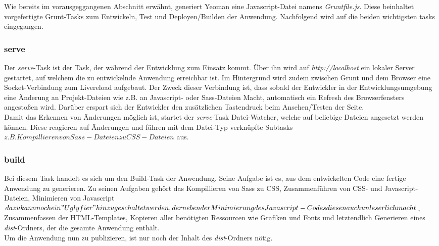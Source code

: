 Wie bereits im vorausgeggangenen Abschnitt erwähnt, generiert Yeoman eine Javascript-Datei namens \textit{Gruntfile.js}. Diese beinhaltet vorgefertigte Grunt-Tasks zum Entwickeln, Test und
Deployen/Builden der Anwendung. Nachfolgend wird auf die beiden wichtigsten tasks eingegangen.

\subsubsection{serve}
Der \textit{serve}-Task ist der Task, der während der Entwicklung zum Einsatz kommt. Über ihn wird auf \textit{http://localhost} ein lokaler Server gestartet, auf welchem
die zu entwickelnde Anwendung erreichbar ist. Im Hintergrund wird zudem zwischen Grunt und dem Browser eine Socket-Verbindung zum Livereload aufgebaut. Der Zweck dieser Verbindung ist,
dass sobald der Entwickler in der Entwicklungsumgebung eine Änderung an Projekt-Dateien wie z.B. an Javascript- oder Sass-Dateien Macht, automatisch ein Refresh des Browserfensters angestoßen wird.
Darüber erspart sich der Entwickler den zusätzlichen Tastendruck beim Ansehen/Testen der Seite.\\
Damit das Erkennen von Änderungen möglich ist, startet der \textit{serve}-Task Datei-Watcher, welche auf beliebige Dateien angesetzt werden können. Diese reagieren auf Änderungen und führen
mit dem Datei-Typ verknüpfte Subtasks \(z.B. Kompillieren von Sass-Dateien zu CSS-Dateien\) aus.

\subsubsection{build}
Bei diesem Task handelt es sich um den Build-Task der Anwendung. Seine Aufgabe ist es, aus dem entwickelten Code eine fertige Anwendung zu generieren.
Zu seinen Aufgaben gehört das Kompillieren von Sass zu CSS, Zusammenführen von CSS- und Javascript-Dateien, Minimieren von Javascript \(dazu kann noch ein "Uglyfier" hinzugeschaltet werden, der neben
der Minimierung des Javascript-Codes diesen auch unleserlich macht\), Zusammenfassen der HTML-Templates, Kopieren aller benötigten Ressourcen wie Grafiken und Fonts und letztendlich Generieren
eines \textit{dist}-Ordners, der die gesamte Anwendung enthält.\\
Um die Anwendung nun zu publizieren, ist nur noch der Inhalt des \textit{dist}-Ordners nötig.